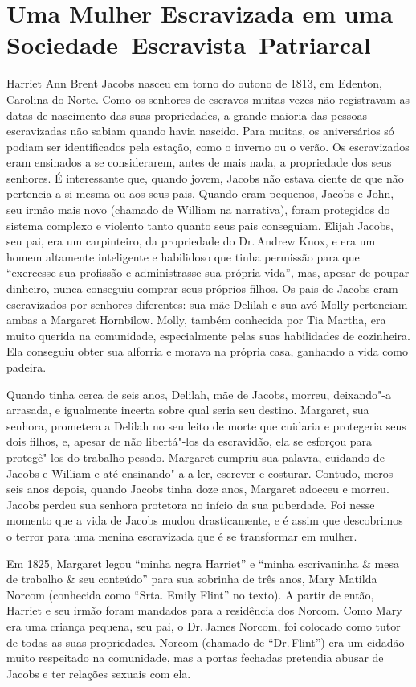 \section{Uma Mulher Escravizada em uma Sociedade~Escravista~Patriarcal}

Harriet Ann Brent Jacobs nasceu em torno do outono de 1813, em Edenton,
Carolina do Norte. Como os senhores de escravos muitas vezes não
registravam as datas de nascimento das suas propriedades, a grande
maioria das pessoas escravizadas não sabiam quando havia nascido. Para
muitas, os aniversários só podiam ser identificados pela estação, como o
inverno ou o verão. Os escravizados eram ensinados a se considerarem, antes
de mais nada, a propriedade dos seus senhores. É interessante que,
quando jovem, Jacobs não estava ciente de que não pertencia a si mesma
ou aos seus pais. Quando eram pequenos, Jacobs e John, seu irmão mais
novo (chamado de William na narrativa), foram protegidos do sistema
complexo e violento tanto quanto seus pais conseguiam. Elijah Jacobs,
seu pai, era um carpinteiro, da propriedade do Dr.\,Andrew Knox, e
era um homem altamente inteligente e habilidoso que
tinha permissão para que ``exercesse sua profissão e administrasse
sua própria vida'', mas, apesar de poupar dinheiro, nunca conseguiu
comprar seus próprios filhos. Os pais de Jacobs eram escravizados por
senhores diferentes: sua mãe Delilah e sua avó Molly pertenciam ambas a
Margaret Hornbilow. Molly, também conhecida por Tia Martha, era muito
querida na comunidade, especialmente pelas suas habilidades de
cozinheira. Ela conseguiu obter sua alforria e morava na própria casa,
ganhando a vida como padeira.

Quando tinha cerca de seis anos, Delilah, mãe de Jacobs, morreu, deixando"-a
arrasada, e igualmente incerta sobre qual seria seu destino.
Margaret, sua senhora, prometera a Delilah no seu leito de morte que
cuidaria e protegeria seus dois filhos, e, apesar de não libertá"-los
da escravidão, ela se esforçou para protegê"-los do trabalho
pesado. Margaret cumpriu sua palavra, cuidando de Jacobs e William e até
ensinando"-a a ler, escrever e costurar. Contudo, meros seis anos depois,
quando Jacobs tinha doze anos, Margaret adoeceu e morreu. Jacobs perdeu
sua senhora protetora no início da sua puberdade. Foi nesse momento que
a vida de Jacobs mudou drasticamente, e é assim que descobrimos o terror
para uma menina escravizada que é se transformar em mulher.

Em 1825, Margaret legou ``minha negra Harriet'' e ``minha escrivaninha
\& mesa de trabalho \& seu conteúdo'' para sua sobrinha de três anos,
Mary Matilda Norcom (conhecida como ``Srta. Emily Flint'' no texto). A
partir de então, Harriet e seu irmão foram mandados para a residência
dos Norcom. Como Mary era uma criança pequena, seu pai, o Dr.\,James
Norcom, foi colocado como tutor de todas
as suas propriedades. Norcom (chamado de ``Dr.\,Flint'') era um cidadão
muito respeitado na comunidade, mas a portas fechadas pretendia abusar
de Jacobs e ter relações sexuais com ela.

